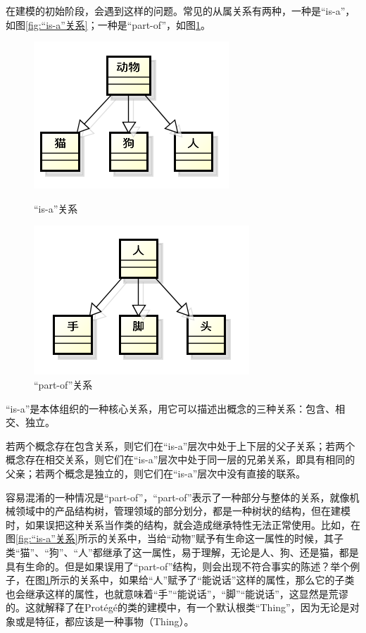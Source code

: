 \documentclass[12pt,a4paper]{article}
\newcommand{\wuhao}{\fontsize{10.5pt}{\baselineskip}\selectfont}
\begin{document}
	在建模的初始阶段，会遇到这样的问题。常见的从属关系有两种，一种是“{\Times is-a}”，如图\ref{fig:“is-a”关系}；一种是“{\Times part-of}”，如图\ref{fig:“part-of”关系}。
	\begin{figure}[htbp]
	\begin{minipage}[t]{0.5\linewidth}
	\centering
	\includegraphics[scale=1]{fig/isA.png}
	\caption{\wuhao “{\Times is-a}”关系}
	\label{fig:“is-a”关系}
	\end{minipage}
	\begin{minipage}[t]{0.5\linewidth}
	\centering
	\includegraphics[scale=1]{fig/partOf.png}
	\caption{\wuhao “{\Times part-of}”关系}
	\label{fig:“part-of”关系}
	\end{minipage}
	\end{figure}
	
	“{\Times is-a}”是本体组织的一种核心关系，用它可以描述出概念的三种关系：包含、相交、独立。
	
	若两个概念存在包含关系，则它们在“{\Times is-a}”层次中处于上下层的父子关系；若两个概念存在相交关系，则它们在“{\Times is-a}”层次中处于同一层的兄弟关系，即具有相同的父亲；若两个概念是独立的，则它们在“{\Times is-a}”层次中没有直接的联系。
	
	容易混淆的一种情况是“{\Times part-of}”，“{\Times part-of}”表示了一种部分与整体的关系，就像机械领域中的产品结构树，管理领域的部分划分，都是一种树状的结构，但在建模时，如果误把这种关系当作类的结构，就会造成继承特性无法正常使用。比如，在图\ref{fig:“is-a”关系}所示的关系中，当给“动物”赋予有生命这一属性的时候，其子类“猫”、“狗”、“人”都继承了这一属性，易于理解，无论是人、狗、还是猫，都是具有生命的。但是如果误用了“{\Times part-of}”结构，则会出现不符合事实的陈述？举个例子，在图\ref{fig:“part-of”关系}所示的关系中，如果给“人”赋予了“能说话”这样的属性，那么它的子类也会继承这样的属性，也就意味着“手”“能说话”，“脚”“能说话”，这显然是荒谬的。这就解释了在{\Times Prot{\'e}g{\'e}}的类的建模中，有一个默认根类“{\Times Thing}”，因为无论是对象或是特征，都应该是一种事物（{\Times Thing}）。
	
\end{document}
